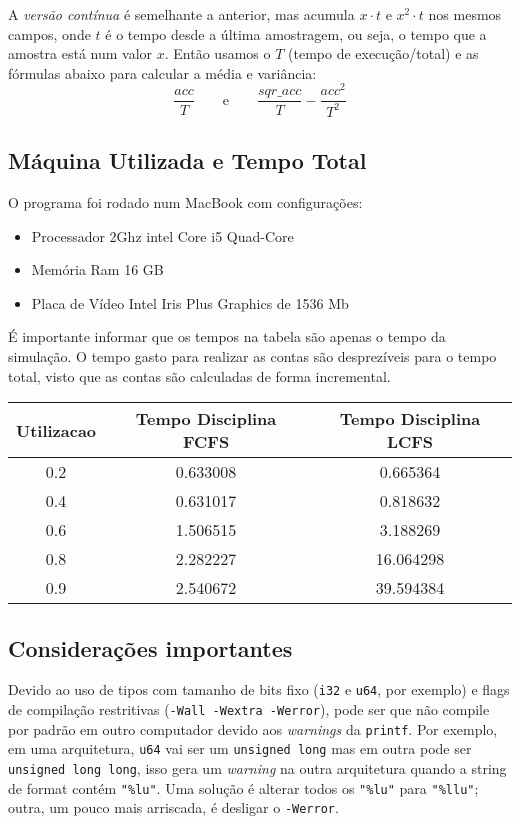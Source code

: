 \documentclass[a4paper]{article}
\newcommand{\inlcode}{\texttt}
\begin{document}
A \emph{versão contínua} é semelhante a anterior,
mas acumula \(x \cdot t\) e \(x^2 \cdot t\) nos mesmos campos,
onde \(t\) é
o tempo desde a última amostragem, ou seja,
o tempo que a amostra está num valor \(x\).
Então usamos o \(T\) (tempo de execução/total)
e as fórmulas abaixo para calcular a média e variância:
\[
    \frac{acc}{T}
    \qquad\text{e}\qquad
    \frac{sqr\_acc}{T} - \frac{acc^2}{T^2}
\]

\subsection{Máquina Utilizada e Tempo Total}
O programa foi rodado num MacBook com configurações:
\begin{itemize}
    \item Processador 2Ghz intel Core i5 Quad-Core
    \item Memória Ram 16 GB
    \item Placa de Vídeo Intel Iris Plus Graphics de 1536 Mb
\end{itemize}


É importante informar que os tempos na tabela são apenas o tempo da simulação. O tempo gasto para realizar as contas são desprezíveis para o tempo total, visto que as contas são calculadas de forma incremental.


\begin{center} \begin{tabular}{|c|c|c|}
    \hline
     Utilizacao & Tempo Disciplina FCFS & Tempo Disciplina LCFS\\
    \hline
    0.2 & 0.633008 & 0.665364 \\
    \hline
    0.4 & 0.631017 & 0.818632 \\
    \hline
    0.6 & 1.506515 & 3.188269 \\
    \hline
    0.8 & 2.282227 & 16.064298 \\
    \hline
    0.9 & 2.540672 & 39.594384 \\
    \hline
\end{tabular} \end{center}


\subsection{Considerações importantes}

Devido ao uso de tipos com tamanho de bits fixo
(\inlcode{i32} e \inlcode{u64}, por exemplo)
e flags de compilação restritivas (\inlcode{-Wall -Wextra -Werror}),
pode ser que não compile por padrão em outro computador
devido aos \emph{warnings} da \inlcode{printf}.
Por exemplo, em uma arquitetura,
\inlcode{u64} vai ser um \inlcode{unsigned long}
mas em outra pode ser \inlcode{unsigned long long},
isso gera um \emph{warning} na outra arquitetura
quando a string de format contém \verb."%lu"..
Uma solução é alterar todos os
\verb."%lu". para \verb."%llu".;
outra, um pouco mais arriscada,
é desligar o \inlcode{-Werror}.
\end{document}

